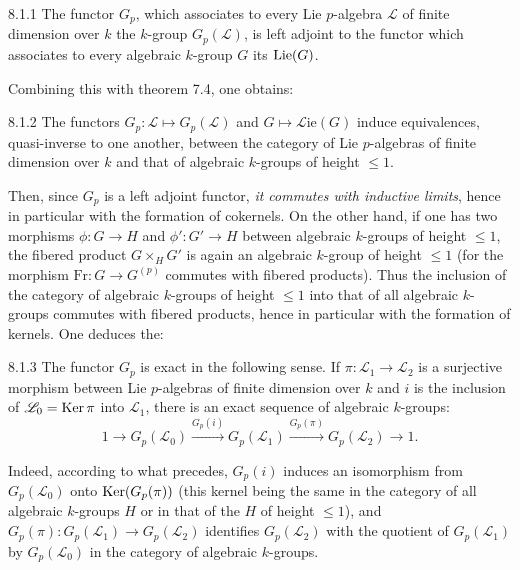 \begin{theorem}{8.1.1}\label{VIIA.8.1.1}
The functor $G_p$, which associates to every Lie $p$-algebra $\mathscr L$ of finite dimension over $k$ the $k$-group $G_p(\mathscr L)$, is left adjoint to the functor which associates to every algebraic $k$-group $G$ its $\operatorname{Lie}(G)$.
\end{theorem}
Combining this with theorem 7.4, one obtains:
\begin{theorem}{8.1.2}\label{VIIA.8.1.2}
The functors $G_p:\mathscr L\mapsto G_p(\mathscr L)$ and $G\mapsto\mathscr L\!\mathrm{ie}(G)$ induce equivalences, quasi-inverse to one another, between the category of Lie $p$-algebras of finite dimension over $k$ and that of algebraic $k$-groups of height $\leq1$.
\end{theorem}

Then, since $G_p$ is a left adjoint functor, \emph{it commutes with inductive limits}, hence in particular with the formation of cokernels. On the other hand, if one has two morphisms $\phi:G\to H$ and $\phi':G'\to H$ between algebraic $k$-groups of height $\leq1$, the fibered product $G\times_HG'$ is again an algebraic $k$-group of height $\leq1$ (for the morphism $\mathrm{Fr}:G\to G^{(p)}$ commutes with fibered products). Thus the inclusion of the category of algebraic $k$-groups of height $\leq1$ into that of all algebraic $k$-groups commutes with fibered products, hence in particular with the formation of kernels. One deduces the:
\begin{corollary}{8.1.3}\label{VIIA.8.1.3}
The functor $G_p$ is exact in the following sense. If $\pi:\mathscr L_1\to\mathscr L_2$ is a surjective morphism between Lie $p$-algebras of finite dimension over $k$ and $i$ is the inclusion of $\mathscr L_0=\operatorname{Ker}\pi$ into $\mathscr L_1$, there is an exact sequence of algebraic $k$-groups:
\[
1\longrightarrow G_p(\mathscr L_0)\xrightarrow{G_p(i)}G_p(\mathscr L_1)\xrightarrow{G_p(\pi)}G_p(\mathscr L_2)\longrightarrow1.
\]
\end{corollary}
Indeed, according to what precedes, $G_p(i)$ induces an isomorphism from $G_p(\mathscr L_0)$ onto $\operatorname{Ker}(G_p(\pi))$ (this kernel being the same in the category of all algebraic $k$-groups $H$ or in that of the $H$ of height $\leq1$), and $G_p(\pi):G_p(\mathscr L_1)\to G_p(\mathscr L_2)$ identifies $G_p(\mathscr L_2)$ with the quotient of $G_p(\mathscr L_1)$ by $G_p(\mathscr L_0)$ in the category of algebraic $k$-groups.

